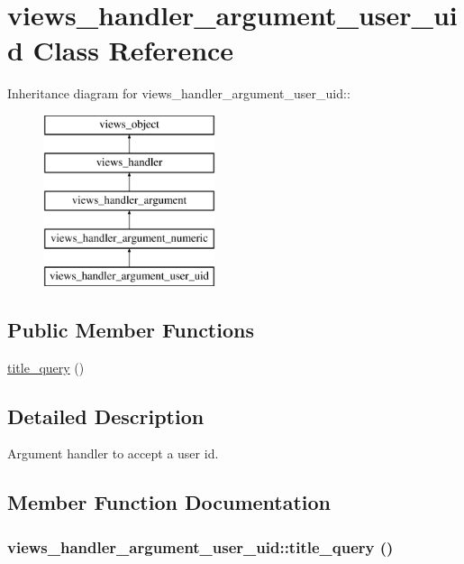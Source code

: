 \hypertarget{classviews__handler__argument__user__uid}{
\section{views\_\-handler\_\-argument\_\-user\_\-uid Class Reference}
\label{classviews__handler__argument__user__uid}
}
Inheritance diagram for views\_\-handler\_\-argument\_\-user\_\-uid::\begin{figure}[H]
\begin{center}
\leavevmode
\includegraphics[height=5cm]{classviews__handler__argument__user__uid}
\end{center}
\end{figure}
\subsection*{Public Member Functions}
\begin{CompactItemize}
\item 
\hyperlink{classviews__handler__argument__user__uid_9ab9aa6bd71e9a2fa2a2c82a88f9dbff}{title\_\-query} ()
\end{CompactItemize}


\subsection{Detailed Description}
Argument handler to accept a user id. 

\subsection{Member Function Documentation}
\hypertarget{classviews__handler__argument__user__uid_9ab9aa6bd71e9a2fa2a2c82a88f9dbff}{
\subsubsection[{title\_\-query}]{\setlength{\rightskip}{0pt plus 5cm}views\_\-handler\_\-argument\_\-user\_\-uid::title\_\-query ()}}
\label{classviews__handler__argument__user__uid_9ab9aa6bd71e9a2fa2a2c82a88f9dbff}



